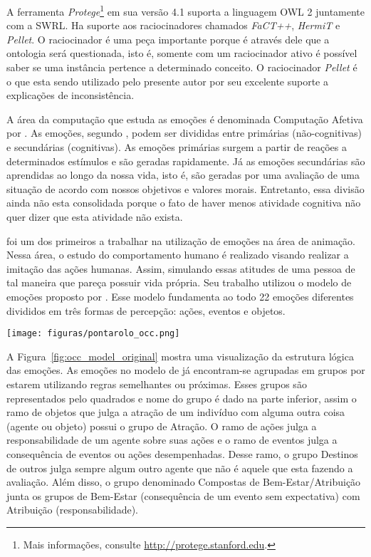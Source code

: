 \documentclass[12pt]{sa}
\newcommand{\dev}{ }
\newcommand{\citet}{\citeonline}
\begin{document}
A ferramenta \emph{Protege}\footnote{Mais informações, consulte \url{http://protege.stanford.edu}.}
em sua versão 4.1 suporta a linguagem OWL 2 juntamente com a SWRL. Ha suporte
aos raciocinadores chamados \emph{FaCT++}, \emph{HermiT} e \emph{Pellet}.
O raciocinador é uma peça importante porque é através dele que a ontologia
será questionada, isto é, somente com um raciocinador ativo é possível saber
se uma instância pertence a determinado conceito. O raciocinador
\emph{Pellet}\dev{} é o que esta sendo utilizado pelo presente autor por
seu excelente suporte a explicações de inconsistência.

A área da computação que estuda as emoções é denominada Computação Afetiva por
\citet{Pic98}. As emoções, segundo \citet{damasio2004erro}, podem ser divididas
entre primárias (não-cognitivas) e secundárias (cognitivas). As emoções
primárias surgem a partir de reações a determinados estímulos e são geradas
rapidamente. Já as emoções secundárias são aprendidas ao longo da nossa vida,
isto é, são geradas por uma avaliação de uma situação de acordo com nossos
objetivos e valores morais. Entretanto, essa divisão ainda não esta
consolidada porque o fato de haver menos atividade cognitiva não quer dizer
que esta atividade não exista.

\citet{bates1994role} foi um dos primeiros a trabalhar na utilização de
emoções na área de animação. Nessa área, o estudo do comportamento humano é
realizado visando realizar a imitação das ações humanas. Assim, simulando
essas atitudes de uma pessoa de tal maneira que pareça possuir vida própria.
Seu trabalho utilizou o modelo de emoções proposto por \citet{ortony1988cse}.
Esse modelo fundamenta ao todo 22 emoções diferentes divididos em três
formas de percepção: ações, eventos e objetos.

\begin{figure*}
  \centering
    \texttt{[image: figuras/pontarolo\_occ.png]}
  \caption{Modelo OCC adaptado de \cite{pontarolo2008modelagem}.}
  \label{fig:occ_model_original}
\end{figure*}

A Figura~\ref{fig:occ_model_original} mostra uma visualização da estrutura
lógica das emoções. As emoções no modelo de \citet{ortony1988cse} já
encontram-se agrupadas em grupos por estarem utilizando regras semelhantes ou
próximas. Esses grupos são representados pelo quadrados e nome do grupo é dado
na parte inferior, assim o ramo de objetos que julga a atração de um indivíduo
com alguma outra coisa (agente ou objeto) possui o grupo de Atração. O ramo de
ações julga a responsabilidade de um agente sobre suas ações e o ramo de
eventos julga a consequência de eventos ou ações desempenhadas. Desse ramo,
o grupo Destinos de outros julga sempre algum outro agente que não é aquele
que esta fazendo a avaliação. Além disso, o grupo denominado Compostas de
Bem-Estar/Atribuição junta os grupos de Bem-Estar (consequência de um evento
sem expectativa) com Atribuição (responsabilidade).
\end{document}
